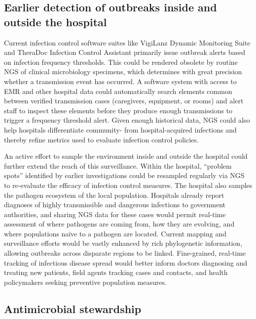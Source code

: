\subsection{Earlier detection of outbreaks inside and outside the hospital}

Current infection control software suites like VigiLanz Dynamic Monitoring Suite and TheraDoc Infection Control Assistant primarily issue outbreak alerts based on infection frequency thresholds. This could be rendered obsolete by routine NGS of clinical microbiology specimens, which determines with great precision whether a transmission event has occurred.\autocite{Didelot2012,Koser2012} A software system with access to EMR and other hospital data could automatically search elements common between verified transmission cases (caregivers, equipment, or rooms) and alert staff to inspect these elements before they produce enough transmissions to trigger a frequency threshold alert. Given enough historical data, NGS could also help hospitals differentiate community- from hospital-acquired infections and thereby refine metrics used to evaluate infection control policies.

An active effort to sample the environment inside and outside the hospital could further extend the reach of this surveillance. Within the hospital, “problem spots” identified by earlier investigations could be resampled regularly via NGS to re-evaluate the efficacy of infection control measures. The hospital also samples the pathogen ecosystem of the local population. Hospitals already report diagnoses of highly transmissible and dangerous infections to government authorities, and sharing NGS data for these cases would permit real-time assessment of where pathogens are coming from, how they are evolving, and where populations naïve to a pathogen are located. Current mapping and surveillance efforts \autocite{Brownstein2008} would be vastly enhanced by rich phylogenetic information, allowing outbreaks across disparate regions to be linked.\autocite{Chin2011,McAdam2012,Rasko2011} Fine-grained, real-time tracking of infectious disease spread would better inform doctors diagnosing and treating new patients, field agents tracking cases and contacts, and health policymakers seeking preventive population measures.

\subsection{Antimicrobial stewardship}

